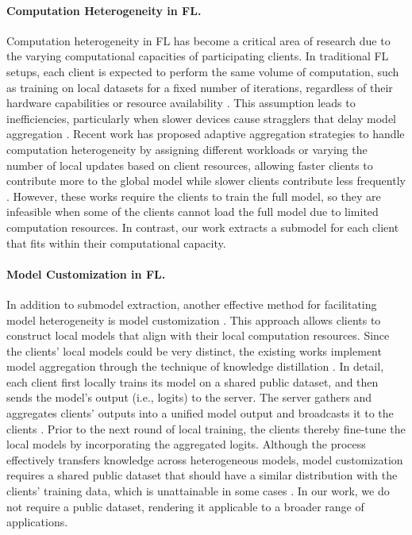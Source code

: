 \documentclass{article}
\renewcommand{\cite}{\citep}
\theoremstyle{plain}
\theoremstyle{definition}
\theoremstyle{remark}
\begin{document}
\paragraph{Computation Heterogeneity in FL.}  
Computation heterogeneity in FL has become a critical area of research due to the varying computational capacities of participating clients. In traditional FL setups, each client is expected to perform the same volume of computation, such as training on local datasets for a fixed number of iterations, regardless of their hardware capabilities or resource availability \cite{fang2022communication, fang2024hierarchical, he2023gluefl, wang2024fedcda, hu2024aggregation, wang2024fedhkd}. This assumption leads to inefficiencies, particularly when slower devices cause stragglers that delay model aggregation \cite{li2019convergence, wang2020tackling, hu2022gitfl}. Recent work has proposed adaptive aggregation strategies to handle computation heterogeneity by assigning different workloads or varying the number of local updates based on client resources, allowing faster clients to contribute more to the global model while slower clients contribute less frequently \cite{wang2020tackling, li2020federated, mitra2021linear, luo2021cost, shin2022fedbalancer, wu2023deterioration}. However, these works require the clients to train the full model, so they are infeasible when some of the clients cannot load the full model due to limited computation resources. In contrast, our work extracts a submodel for each client that fits within their computational capacity. 

\paragraph{Model Customization in FL.} In addition to submodel extraction, another effective method for facilitating model heterogeneity is model customization \cite{lin2020ensemble, zhang2021parameterized, itahara2021distillation, cho2022heterogeneous, wang2023towards, zhang2023distill}. This approach allows clients to construct local models that align with their local computation resources. Since the clients' local models could be very distinct, the existing works implement model aggregation through the technique of knowledge distillation \cite{hinton2015distilling, wang2023dafkd, lin2020ensemble, zhang2022fine}. In detail, each client first locally trains its model on a shared public dataset, and then sends the model’s output (i.e., logits) to the server. The server gathers and aggregates clients’ outputs into a unified model output and broadcasts it to the clients \cite{wang2022fedkc}. Prior to the next round of local training, the clients thereby fine-tune the local models by incorporating the aggregated logits. Although the process effectively transfers knowledge across heterogeneous models, model customization requires a shared public dataset that should have a similar distribution with the clients' training data, which is unattainable in some cases \cite{stanton2021does, alballa2023first}. In our work, we do not require a public dataset, rendering it applicable to a broader range of applications.
\end{document}
